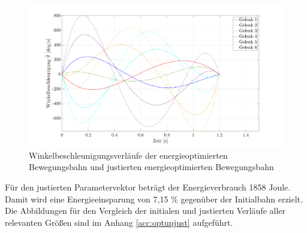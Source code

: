 \begin{figure}[tbph]
	\centering
	\includegraphics[width=1\linewidth]{images/Optimierungsergebnisse_up/accoptedit}
	\caption{Winkelbeschleunigungsverläufe der energieoptimierten Bewegungsbahn und justierten energieoptimierten Bewegungsbahn}
	\label{fig:accoptedit}
\end{figure}
%
Für den justierten Parametervektor beträgt der Energieverbrauch 1858 Joule. Damit wird eine Energieeinsparung von 7,15 \% gegenüber der Initialbahn erzielt. Die Abbildungen für den Vergleich der initialen und justierten Verläufe aller relevanten Größen sind im Anhang \ref{acc:optupjust} aufgeführt.
%
